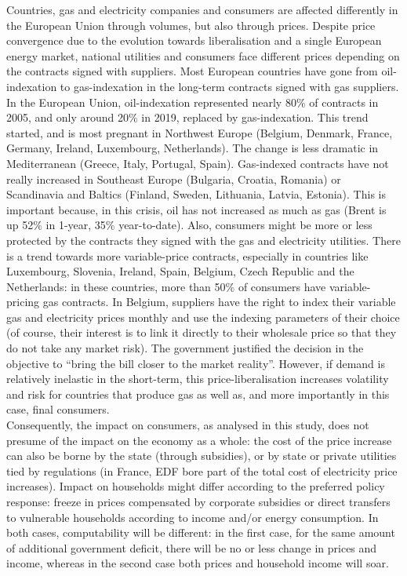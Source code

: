 \documentclass[
  9pt,
  a4paper,
  DIV=11,
  numbers=noendperiod]{scrartcl}
\begin{document}
Countries, gas and electricity companies and consumers are affected
differently in the European Union through volumes, but also through
prices. Despite price convergence due to the evolution towards
liberalisation and a single European energy market, national utilities
and consumers face different prices depending on the contracts signed
with suppliers. Most European countries have gone from oil-indexation to
gas-indexation in the long-term contracts signed with gas suppliers. In
the European Union, oil-indexation represented nearly 80\% of contracts
in 2005, and only around 20\% in 2019, replaced by gas-indexation. This
trend started, and is most pregnant in Northwest Europe (Belgium,
Denmark, France, Germany, Ireland, Luxembourg, Netherlands). The change
is less dramatic in Mediterranean (Greece, Italy, Portugal, Spain).
Gas-indexed contracts have not really increased in Southeast Europe
(Bulgaria, Croatia, Romania) or Scandinavia and Baltics (Finland,
Sweden, Lithuania, Latvia, Estonia). This is important because, in this
crisis, oil has not increased as much as gas (Brent is up 52\% in
1-year, 35\% year-to-date). Also, consumers might be more or less
protected by the contracts they signed with the gas and electricity
utilities. There is a trend towards more variable-price contracts,
especially in countries like Luxembourg, Slovenia, Ireland, Spain,
Belgium, Czech Republic and the Netherlands: in these countries, more
than 50\% of consumers have variable-pricing gas contracts. In Belgium,
suppliers have the right to index their variable gas and electricity
prices monthly and use the indexing parameters of their choice (of
course, their interest is to link it directly to their wholesale price
so that they do not take any market risk). The government justified the
decision in the objective to ``bring the bill closer to the market
reality''. However, if demand is relatively inelastic in the short-term,
this price-liberalisation increases volatility and risk for countries
that produce gas as well as, and more importantly in this case, final
consumers.\\
Consequently, the impact on consumers, as analysed in this study, does
not presume of the impact on the economy as a whole: the cost of the
price increase can also be borne by the state (through subsidies), or by
state or private utilities tied by regulations (in France, EDF bore part
of the total cost of electricity price increases). Impact on households
might differ according to the preferred policy response: freeze in
prices compensated by corporate subsidies or direct transfers to
vulnerable households according to income and/or energy consumption. In
both cases, computability will be different: in the first case, for the
same amount of additional government deficit, there will be no or less
change in prices and income, whereas in the second case both prices and
household income will soar.
\end{document}
